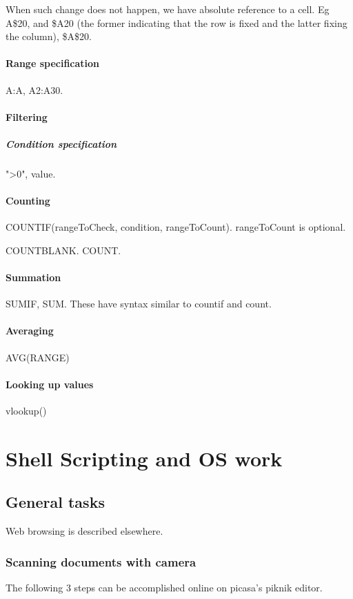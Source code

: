 When such change does not happen, we have absolute reference to a cell. Eg A\$20, and \$A20 (the former indicating that the row is fixed and the latter fixing the column), \$A\$20.

\subsection{Range specification}
A:A, A2:A30.

\subsection{Filtering}


\subsubsection{Condition specification}
">0", value.

\subsection{Counting}
COUNTIF(rangeToCheck, condition, rangeToCount). rangeToCount is optional.

COUNTBLANK. COUNT.

\subsection{Summation}
SUMIF, SUM. These have syntax similar to countif and count.


\subsection{Averaging}
AVG(RANGE)

\subsection{Looking up values}
vlookup()

\part{Shell Scripting and OS work}
\chapter{General tasks}
Web browsing is described elsewhere.

\section{Scanning documents with camera}
The following 3 steps can be accomplished online on picasa's piknik editor.

